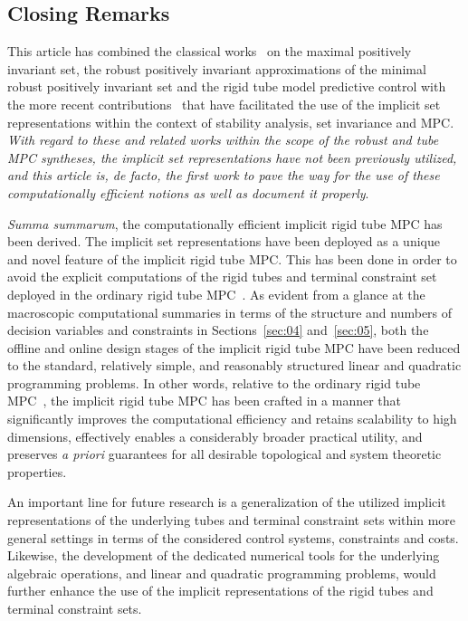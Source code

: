 \documentclass[twocolumn]{autart}
\numberwithin{equation}{section}
\begin{document}
\subsection{Closing Remarks}
\label{sec:06.03}

This article has combined the classical works~\cite{gilbert:tan:1991,rakovic:kerrigan:kouramas:mayne:2004b,mayne:seron:rakovic:2005} on the maximal positively invariant set, the robust positively invariant approximations of the minimal robust positively invariant set and the rigid tube model predictive control with the more recent contributions~\cite{rakovic:2022,rakovic:zhang:2023:a,rakovic:zhang:2023:b} that have facilitated the use of the implicit set representations within the context of stability analysis, set invariance and MPC.  \emph{With regard to these and related works within the scope of the robust and tube MPC syntheses, the implicit set representations have not been previously utilized, and this article is, \emph{de facto}, the first work to pave the way for the use of these computationally efficient notions as well as document it properly}. 


\emph{Summa summarum}, the computationally efficient implicit rigid tube MPC has been derived. The implicit set representations have been  deployed as a unique and novel feature of the implicit rigid tube MPC. This has been done in order to avoid the explicit computations of the rigid tubes and terminal constraint set deployed in the ordinary rigid tube MPC~\cite{mayne:seron:rakovic:2005}. As evident from a glance at the macroscopic computational summaries in terms of the structure and numbers of decision variables and constraints in Sections~\ref{sec:04} and~\ref{sec:05}, both the offline and online design stages of the implicit rigid tube MPC have been reduced to the standard, relatively simple, and reasonably structured linear and quadratic programming problems. In other words, relative to the ordinary rigid tube MPC~\cite{mayne:seron:rakovic:2005}, the implicit rigid tube MPC has been crafted in a manner that significantly improves the computational efficiency and retains scalability to high dimensions, effectively enables  a considerably broader practical utility, and preserves \emph{a priori} guarantees for all desirable topological and system theoretic properties.


An important line for future research is a generalization of the utilized implicit representations of the underlying tubes and terminal constraint sets within more general settings in terms of the considered control systems, constraints and costs.  Likewise, the development of the dedicated numerical tools for the underlying algebraic operations, and linear and quadratic programming problems, would further enhance the use of the implicit representations of the rigid tubes and terminal constraint sets. 
\end{document}
